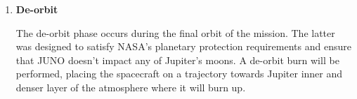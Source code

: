 \begin{enumerate}
    \item \textbf{De-orbit}
    
    The de-orbit phase occurs during the final orbit of the mission. The latter was designed to satisfy NASA's planetary protection requirements and ensure that JUNO doesn't impact any of Jupiter's moons. A de-orbit burn will be performed, placing the spacecraft on a trajectory towards Jupiter inner and denser layer of the atmosphere where it will burn up.   
     
\end{enumerate}